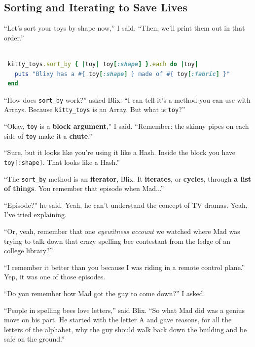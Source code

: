 \documentclass[10pt,twoside]{report}
\begin{document}
\subsection{Sorting and Iterating to Save Lives}



``Let's sort your toys by shape now,'' I said.  ``Then, we'll print
them out in that order.''


\begin{lstlisting}[basicstyle=\ttfamily\color{basiccolor},
    commentstyle = \ttfamily\color{commentcolor},
    keywordstyle=\ttfamily\color{keywordscolor},
    stringstyle=\color{stringcolor},
    language=Ruby,
    basicstyle=\small\ttfamily,
    showstringspaces=false,
  ]

 kitty_toys.sort_by { |toy| toy[:shape] }.each do |toy| 
   puts "Blixy has a #{ toy[:shape] } made of #{ toy[:fabric] }"
 end

\end{lstlisting}


``How does \lstinline[breaklines=true]|sort_by| work?'' asked Blix.
``I can tell it's a method you can use with Arrays.  Because
\lstinline[breaklines=true]|kitty_toys| is an Array.  But what is
\lstinline[breaklines=true]|toy|?''

``Okay, \lstinline[breaklines=true]|toy| is a {\bf block argument},''
I said.  ``Remember: the skinny pipes on each side of
\lstinline[breaklines=true]|toy| make it a {\bf chute}.''

``Sure, but it looks like you're using it like a Hash.  Inside the
block you have \lstinline[breaklines=true]|toy[:shape]|. That looks
like a Hash.''

``The \lstinline[breaklines=true]|sort_by| method is an {\bf
  iterator}, Blix.  It {\bf iterates}, or {\bf cycles}, through {\bf a
  list of things}.  You remember that episode when Mad...''

``Episode?'' he said.  Yeah, he can't understand the concept of TV
dramas.  Yeah, I've tried explaining.

``Or, yeah, remember that one {\em eyewitness account} we watched
where Mad was trying to talk down that crazy spelling bee contestant
from the ledge of an college library?''

``I remember it better than you because I was riding in a remote
control plane.''  Yep, it was one of those episodes.

``Do you remember how Mad got the guy to come down?'' I asked.

``People in spelling bees love letters,'' said Blix.  ``So what Mad
did was a genius move on his part. He started with the letter A and
gave reasons, for all the letters of the alphabet, why the guy should
walk back down the building and be safe on the ground.''
\end{document}
